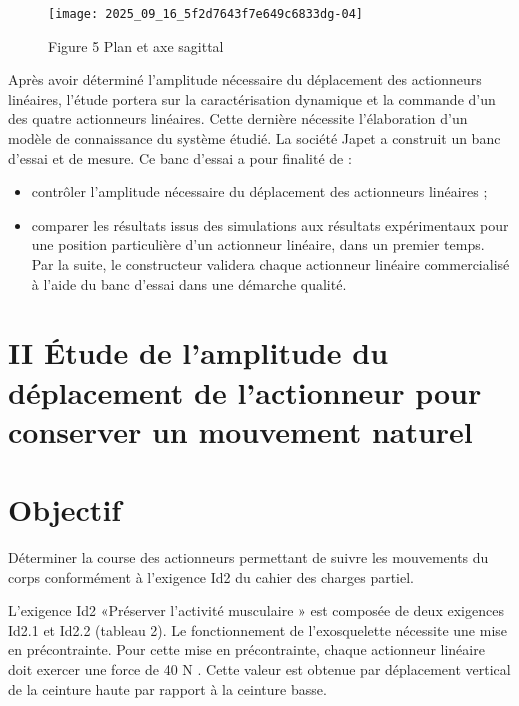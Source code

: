 \begin{figure}[h]
\begin{center}
  \texttt{[image: 2025\_09\_16\_5f2d7643f7e649c6833dg-04]}
\captionsetup{labelformat=empty}
\caption{Figure 5 Plan et axe sagittal}
\end{center}
\end{figure}

Après avoir déterminé l'amplitude nécessaire du déplacement des actionneurs linéaires, l'étude portera sur la caractérisation dynamique et la commande d'un des quatre actionneurs linéaires. Cette dernière nécessite l'élaboration d'un modèle de connaissance du système étudié. La société Japet a construit un banc d'essai et de mesure. Ce banc d'essai a pour finalité de :

\begin{itemize}
  \item contrôler l'amplitude nécessaire du déplacement des actionneurs linéaires ;
  \item comparer les résultats issus des simulations aux résultats expérimentaux pour une position particulière d'un actionneur linéaire, dans un premier temps.\\
Par la suite, le constructeur validera chaque actionneur linéaire commercialisé à l'aide du banc d'essai dans une démarche qualité.
\end{itemize}

\section{II Étude de l'amplitude du déplacement de l'actionneur pour conserver un mouvement naturel}
\section{Objectif}
Déterminer la course des actionneurs permettant de suivre les mouvements du corps conformément à l'exigence Id2 du cahier des charges partiel.

L'exigence Id2 «Préserver l'activité musculaire » est composée de deux exigences Id2.1 et Id2.2 (tableau 2). Le fonctionnement de l'exosquelette nécessite une mise en précontrainte. Pour cette mise en précontrainte, chaque actionneur linéaire doit exercer une force de 40 N . Cette valeur est obtenue par déplacement vertical de la ceinture haute par rapport à la ceinture basse.

